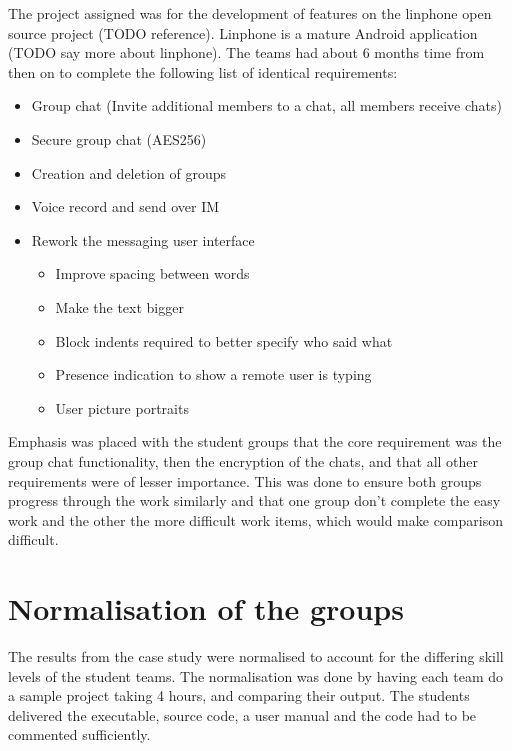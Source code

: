 \documentclass{sig-alternate-05-2015}
\begin{document}
The project  assigned was for the development of features on the linphone open source project (TODO reference). Linphone is a mature Android application (TODO say more about linphone). The teams had about 6 months time from then on to complete the following list of identical requirements:
\\
\begin{itemize}
	\item Group chat (Invite additional members to a chat, all members receive chats)
	\item Secure group chat (AES256)
	\item Creation and deletion of groups
	\item Voice record and send over IM
	\item Rework the messaging user interface
	\begin{itemize}
		\item Improve spacing between words
		\item Make the text bigger
		\item Block indents required to better specify who said what
		\item Presence indication to show a remote user is typing
		\item User picture portraits
	\end{itemize}
\end{itemize}

Emphasis was placed with the student groups that the core requirement was the group chat functionality, then the encryption of the chats, and that all other requirements were of lesser importance. This was done to ensure both groups progress through the work similarly and that one group don't complete the easy work and the other the more difficult work items, which would make comparison difficult.  


\section{Normalisation of the groups}

The results from the case study were normalised to account for the differing skill levels of the student teams. The normalisation was done by having each team do a sample project taking 4 hours, and comparing their output. The students delivered the executable, source code, a user manual and the code had to be commented sufficiently.
\end{document}
